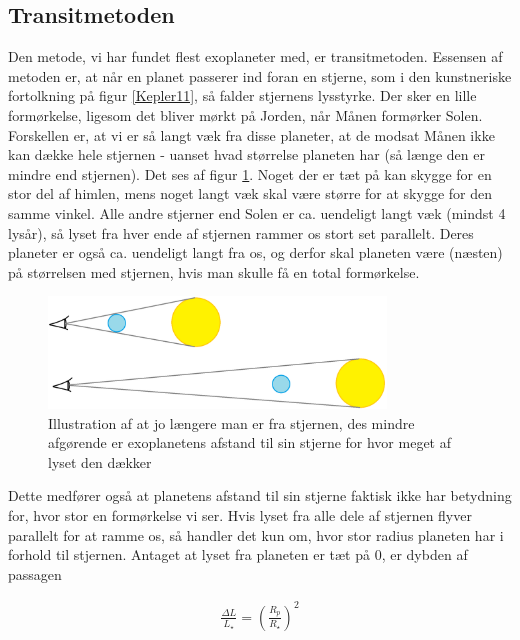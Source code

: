 \subsection*{Transitmetoden}

Den metode, vi har fundet flest exoplaneter med, er transitmetoden. Essensen af metoden er, at når en planet passerer ind foran en stjerne, som i den kunstneriske fortolkning på figur \ref{Kepler11}, så falder stjernens lysstyrke. Der sker en lille formørkelse, ligesom det bliver mørkt på Jorden, når Månen formørker Solen. Forskellen er, at vi er så langt væk fra disse planeter, at de modsat Månen ikke kan dække hele stjernen - uanset hvad størrelse planeten har (så længe den er mindre end stjernen). Det ses af figur \ref{UbetydeligRadius}. Noget der er tæt på kan skygge for en stor del af himlen, mens noget langt væk skal være større for at skygge for den samme vinkel. Alle andre stjerner end Solen er ca. uendeligt langt væk (mindst 4 lysår), så lyset fra hver ende af stjernen rammer os stort set parallelt. Deres planeter er også ca. uendeligt langt fra os, og derfor skal planeten være (næsten) på størrelsen med stjernen, hvis man skulle få en total formørkelse.
\begin{figure}[h!]
    \centering
    \includegraphics[width = 0.8\textwidth]{Astrofysik/billeder/UbetydeligRadius.png} 
    \caption{Illustration af at jo længere man er fra stjernen, des mindre afgørende er exoplanetens afstand til sin stjerne for hvor meget af lyset den dækker}
    \label{UbetydeligRadius} %
\end{figure}

Dette medfører også at planetens afstand til sin stjerne faktisk ikke har betydning for, hvor stor en formørkelse vi ser. Hvis lyset fra alle dele af stjernen flyver parallelt for at ramme os, så handler det kun om, hvor stor radius planeten har i forhold til stjernen. Antaget at lyset fra planeten er tæt på 0, er dybden af passagen

\begin{align} \label{eq:DeltaL}
    \frac{\Delta L}{L_\star } = \left( \frac{R_p}{R_\star } \right)^2
\end{align}

